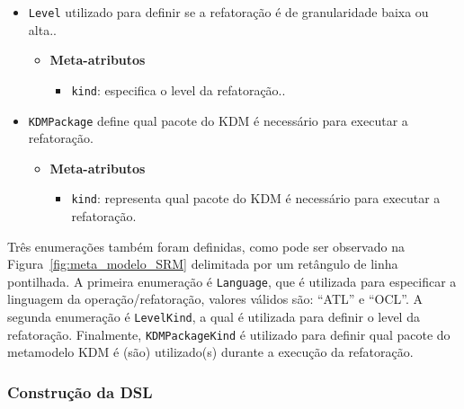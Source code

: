 \begin{itemize}
\item \texttt{Level} utilizado para definir se a refatoração é de granularidade baixa ou alta..

\begin{itemize}
	\item \textbf{Meta-atributos}
		\begin{itemize}
			\item \texttt{kind}: especifica o level da refatoração..
		\end{itemize}	
\end{itemize} 

\item \texttt{KDMPackage} define qual pacote do KDM é necessário para executar a refatoração.

\begin{itemize}
	\item \textbf{Meta-atributos}
		\begin{itemize}
			\item \texttt{kind}: representa qual pacote do KDM é necessário para executar a refatoração.
		\end{itemize}	
\end{itemize} 

\end{itemize}

Três enumerações também foram definidas, como pode ser observado na Figura~\ref{fig:meta_modelo_SRM} delimitada por um retângulo de linha pontilhada. A primeira enumeração é \texttt{Language}, que é utilizada para especificar a linguagem da operação/refatoração, valores válidos são: ``ATL'' e ``OCL''. A segunda enumeração é \texttt{LevelKind}, a qual é utilizada para definir o level da refatoração. Finalmente, \texttt{KDMPackageKind} é utilizado para definir qual pacote do metamodelo KDM é (são) utilizado(s) durante a execução da refatoração. 



\subsubsection{Construção da DSL}

